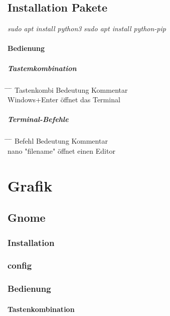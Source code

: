 \documentclass[10pt,a4paper,twoside]{book}
\begin{document}
\section{Installation Pakete}
\textit{sudo apt install python3}
\textit{sudo apt install python-pip}
\subsubsection{Bedienung}
\paragraph{Tastemkombination}
\begin{tabbing}
\hspace*{1mm} \=\hspace*{30mm} \=\hspace*{40mm} \= \kill
\> Tastenkombi \> Bedeutung \> Kommentar \\
\> Windows+Enter \> öffnet das Terminal
\end{tabbing}
\paragraph{Terminal-Befehle}
\begin{tabbing}
\hspace*{1mm} \=\hspace*{30mm} \=\hspace*{40mm} \= \kill
\> Befehl \> Bedeutung \> Kommentar \\
\> nano "filename" \> öffnet einen Editor
\end{tabbing}
\chapter{Grafik}
\section{Gnome}
\subsection{Installation}
\subsection{config}
\subsection{Bedienung}
\subsubsection{Tastenkombination}
\end{document}
